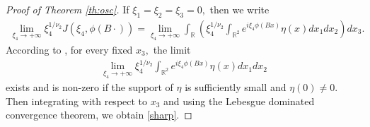 \documentclass[a4paper, 11pt]{article}
\theoremstyle{plain}
\theoremstyle{definition}
\theoremstyle{lemma}
\theoremstyle{Remark}
\newtheorem{Remark}[theorem]{Remark}
\theoremstyle{proposition}
\theoremstyle{corollary}
\theoremstyle{example}
\theoremstyle{assumption}
\begin{document}
\begin{proof}[Proof of Theorem \ref{th:osc}]
 If $\xi_1=\xi_2=\xi_3=0,$ then we write
 \begin{eqnarray*}
 \lim_{\xi_4\to +\infty} \xi_4^{1/\nu_2} J(\xi_4, \phi(B\cdot))=\lim_{\xi_4\to +\infty} \int_{\mathbb{R}}  \left(\xi_4^{1/\nu_2} \int_{\mathbb{R}^2}e^{i\xi_4\phi(Bx)} {\eta}(x)dx_1dx_2\right)dx_3.
 \end{eqnarray*}
 According to  \cite[Theorem 0.6]{Var}, for every fixed $x_3,$ the limit
\begin{eqnarray*}
 \lim_{\xi_4\to +\infty} \xi_4^{1/\nu_2} \int_{\mathbb{R}^2}e^{i\xi_4\phi(Bx)} {\eta}(x)dx_1dx_2
  \end{eqnarray*}
 exists and is non-zero  if the support of $\eta$ is sufficiently small and $\eta(0)\neq 0.$ Then integrating with respect to $x_3$ and using the Lebesgue dominated convergence theorem, we obtain \eqref{sharp}.





\end{proof}



\end{document}
